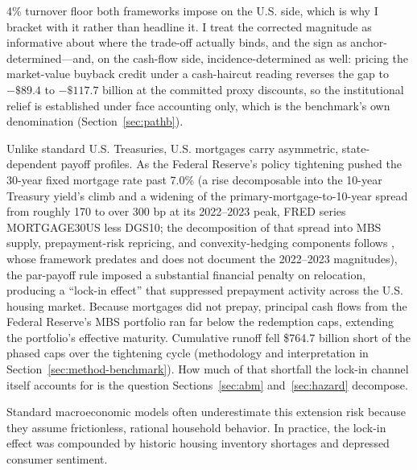 \documentclass[12pt]{article}
\begin{document}
4\% turnover floor both frameworks impose on the U.S. side, which is why I bracket with it rather than headline it. I treat the corrected magnitude as informative about where the trade-off actually binds, and the sign as anchor-determined---and, on the cash-flow side, incidence-determined as well: pricing the market-value buyback credit under a cash-haircut reading reverses the gap to $-\$89.4$ to $-\$117.7$ billion at the committed proxy discounts, so the institutional relief is established under face accounting only, which is the benchmark's own denomination (Section~\ref{sec:pathb}).

Unlike standard U.S. Treasuries, U.S. mortgages carry asymmetric, state-dependent payoff profiles. As the Federal Reserve's policy tightening pushed the 30-year fixed mortgage rate past 7.0\% (a rise decomposable into the 10-year Treasury yield's climb and a widening of the primary-mortgage-to-10-year spread from roughly 170 to over 300 bp at its 2022--2023 peak, FRED series MORTGAGE30US less DGS10; the decomposition of that spread into MBS supply, prepayment-risk repricing, and convexity-hedging components follows \citet{boyarchenko2019}, whose framework predates and does not document the 2022--2023 magnitudes), the par-payoff rule imposed a substantial financial penalty on relocation, producing a ``lock-in effect'' that suppressed prepayment activity across the U.S. housing market. Because mortgages did not prepay, principal cash flows from the Federal Reserve's MBS portfolio ran far below the redemption caps, extending the portfolio's effective maturity. Cumulative runoff fell \$764.7 billion short of the phased caps over the tightening cycle (methodology and interpretation in Section~\ref{sec:method-benchmark}). How much of that shortfall the lock-in channel itself accounts for is the question Sections~\ref{sec:abm} and~\ref{sec:hazard} decompose.

Standard macroeconomic models often underestimate this extension risk because they assume frictionless, rational household behavior. In practice, the lock-in effect was compounded by historic housing inventory shortages and depressed consumer sentiment.
\end{document}
